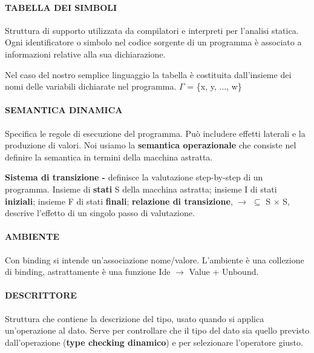 \documentclass[a4paper, 12pt]{article}
\begin{document}
\paragraph{TABELLA DEI SIMBOLI}
Struttura di supporto utilizzata da compilatori e interpreti per l'analisi statica. Ogni
identificatore o simbolo nel codice sorgente di un programma è associato a informazioni
relative alla sua dichiarazione.
 
Nel caso del nostro semplice linguaggio la tabella è costituita dall'insieme dei nomi delle
variabili dichiarate nel programma. $\Gamma$ = \{x, y, ..., w\}

\paragraph{SEMANTICA DINAMICA}
Specifica le regole di esecuzione del programma. Può includere effetti laterali e la
produzione di valori. Noi usiamo la \textbf{semantica operazionale} che consiste
nel definire la semantica in termini della macchina astratta.

\textbf{Sistema di transizione -} definisce la valutazione step-by-step di un programma.
Insieme di \textbf{stati} S della macchina astratta; insieme I di stati \textbf{iniziali};
insieme F di stati \textbf{finali}; \textbf{relazione di transizione}, $\rightarrow$
$\subseteq$ S $\times$ S, descrive l'effetto di un singolo passo di valutazione.

\paragraph{AMBIENTE}
Con binding si intende un'associazione nome/valore. L'ambiente è una collezione di binding,
astrattamente è una funzione Ide $\rightarrow$ Value + Unbound.

\paragraph{DESCRITTORE}
Struttura che contiene la descrizione del tipo, usato quando si applica un'operazione al
dato. Serve per controllare che il tipo del dato sia quello previsto dall'operazione
(\textbf{type checking dinamico}) e per selezionare l'operatore giusto. 
  
\end{document}
